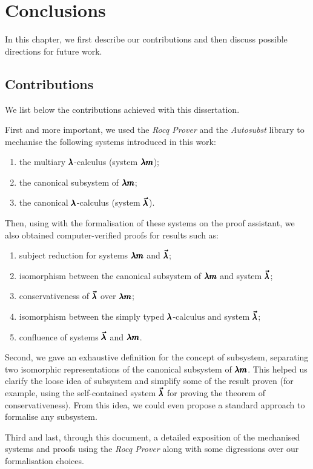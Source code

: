 \chapter{Conclusions}
\label{c:conclusions}

In this chapter, we first describe our contributions and then discuss possible directions for future work.

\section{Contributions}

We list below the contributions achieved with this dissertation.

First and more important, we used the \textit{Rocq Prover} and the \textit{Autosubst} library to mechanise the following systems introduced in this work:
\begin{enumerate}
\item the multiary $\pmb{\lambda}$-calculus (system $\pmb{\lambda m}$);
\item the canonical subsystem of $\pmb{\lambda m}$;
\item the canonical $\pmb{\lambda}$-calculus (system $\pmb{\vec \lambda}$).
\end{enumerate}
Then, using with the formalisation of these systems on the proof assistant, we also obtained computer-verified proofs for results such as:
\begin{enumerate}
\item subject reduction for systems $\pmb{\lambda m}$ and $\pmb{\vec \lambda}$;
\item isomorphism between the canonical subsystem of $\pmb{\lambda m}$ and system $\pmb{\vec \lambda}$;
\item conservativeness of $\pmb{\vec \lambda}$ over $\pmb{\lambda m}$;
\item isomorphism between the simply typed $\pmb{\lambda}$-calculus and system $\pmb{\vec \lambda}$;
\item confluence of systems $\pmb{\vec \lambda}$ and $\pmb{\lambda m}$.
\end{enumerate}

Second, we gave an exhaustive definition for the concept of subsystem, separating two isomorphic representations of the canonical subsystem of $\pmb{\lambda m}$.
This helped us clarify the loose idea of subsystem and simplify some of the result proven (for example, using the self-contained system $\pmb{\vec \lambda}$ for proving the theorem of conservativeness).
From this idea, we could even propose a standard approach to formalise any subsystem.

Third and last, through this document, a detailed exposition of the mechanised systems and proofs using the \textit{Rocq Prover} along with some digressions over our formalisation choices.

